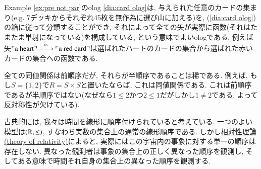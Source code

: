 \begin{remark}


Example \ref{ex:pre not par}のolog \eqref{dia:card olog}は, 与えられた任意のカードの集まり(e.g. 7デッキからそれぞれ45枚を無作為に選び山に加える)を, (\ref{dia:card olog})の箱に従って分類することができ, それによって全ての矢が実際に函数(それはたまたま単射になっている)を構成している, という意味でよいologである. 例えば矢$\fakebox{a heart}\Too{\tn{is}}\fakebox{a red card}$は選ばれたハートのカードの集合から選ばれた赤いカードの集合への函数である.

\end{remark}

\begin{example}[前順序だが半順序ではない例]


全ての同値関係は前順序だが, それらが半順序であることは稀である. 例えば, もし$S=\{1,2\}$で$R=S\times S$と置いたならば, これは同値関係である. これは前順序であるが半順序ではない(なぜなら$1\leq 2$かつ$2\leq 1$だがしかし$1\neq 2$である. よって反対称性が欠けている). 

\end{example}

\begin{application}


古典的には, 我々は時間を線形に順序付けられていると考えている. 一つのよい模型は$({\mathbb R},\leq)$, すなわち実数の集合上の通常の線形順序である. しかし\href{http://en.wikipedia.org/wiki/Relativity_of_simultaneity}{相対性理論(theory of relativity)}によると, 実際にはこの宇宙内の事象に対する単一の順序は存在しない. 異なった観測者は事象の集合上の正しく異なった順序を観測し, そしてある意味で時間それ自身の集合上の異なった順序を観測する.

\end{application}

